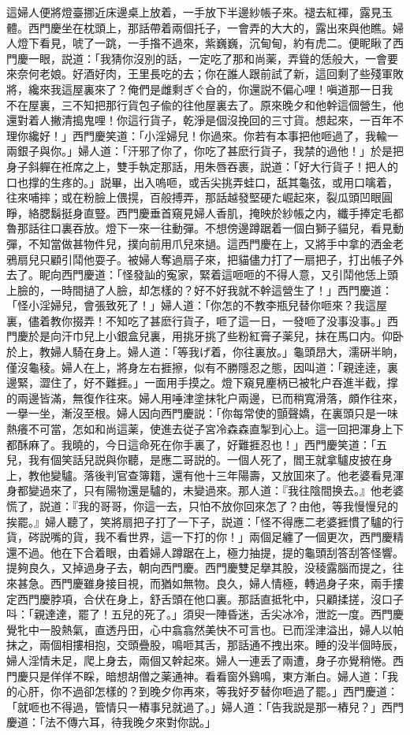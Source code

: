 這婦人便將燈臺挪近床邊桌上放着，一手放下半邊紗帳子來。褪去紅褌，露見玉體。西門慶坐在枕頭上，那話帶着兩個托子，一會弄的大大的，露出來與他瞧。婦人燈下看見，唬了一跳，一手揝不過來，紫巍巍，沉甸甸，約有虎二。便眤瞅了西門慶一眼，説道：「我猜你沒別的話，一定吃了那和尚薬，弄聳的恁般大，一會要來奈何老娘。好酒好肉，王里長吃的去；你在誰人跟前試了新，這回剩了些殘軍敗將，纔來我這屋裏來了？俺們是雌剩ぎぐ㒲的，你還説不偏心哩！嗔道那一日我不在屋裏，三不知把那行貨包子偸的往他屋裏去了。原來晚夕和他幹這個營生，他還對着人撇清搗鬼哩！你這行貨子，乾淨是個沒挽回的三寸貨。想起來，一百年不理你纔好！」西門慶笑道：「小淫婦兒！你過來。你若有本事把他咂過了，我輸一兩銀子與你。」婦人道：「汗邪了你了，你吃了甚麽行貨子，我禁的過他！」於是把身子斜軃在袵席之上，雙手執定那話，用朱唇吞裹，説道：「好大行貨子！把人的口也撑的生疼的。」説畢，出入嗚咂，或舌尖挑弄蛙口，舐其龜弦，或用口噙着，往來哺摔；或在粉臉上偎㨪，百般搏弄，那話越發堅硬た崛起來，裂瓜頭凹眼圓睜，絡腮鬍挺身直豎。西門慶垂首窺見婦人香肌，掩映於紗帳之内，纖手捧定毛都魯那話往口裏吞放。燈下一來一往動彈。不想傍邊蹲踞着一個白獅子貓兒，看見動彈，不知當做甚物件兒，撲向前用爪兒來撾。這西門慶在上，又將手中拿的洒金老鴉扇兒只顧引鬦他耍子。被婦人奪過扇子來，把貓儘力打了一扇把子，打出帳子外去了。眤向西門慶道：「怪發訕的寃家，緊着這咂咂的不得人意，又引鬦他恁上頭上臉的，一時間撾了人臉，却怎樣的？好不好我就不幹這營生了！」西門慶道：「怪小淫婦兒，會張致死了！」婦人道：「你怎的不教李瓶兒替你咂來？我這屋裏，儘着教你掇弄！不知吃了甚麽行貨子，咂了這一日，一發咂了没事没事。」西門慶於是向汗巾兒上小銀盒兒裏，用挑牙挑了些粉紅膏子薬兒，抹在馬口内。仰卧於上，教婦人騎在身上。婦人道：「等我げ着，你往裏放。」龜頭昂大，濡硏半晌，僅沒龜稜。婦人在上，將身左右捱擦，似有不勝隱忍之態，因叫道：「親逹逹，裏邊緊，澀住了，好不難捱。」一面用手摸之。燈下窺見麈柄已被牝户吞進半截，撑的兩邊皆滿，無復作往來。婦人用唾津塗抹牝户兩邊，已而稍寬滑落，頗作往來，一擧一坐，漸沒至根。婦人因向西門慶説：「你每常使的顫聲嬌，在裏頭只是一味熱癢不可當，怎如和尚這薬，使進去従子宮冷森森直掣到心上。這一回把渾身上下都酥麻了。我曉的，今日這命死在你手裏了，好難捱忍也！」西門慶笑道：「五兒，我有個笑話兒説與你聽，是應二哥説的。一個人死了，閻王就拿驢皮披在身上，教他變驢。落後判官查簿籍，還有他十三年陽壽，又放囬來了。他老婆看見渾身都變過來了，只有陽物還是驢的，未變過來。那人道：『我往陰間换去。』他老婆慌了，説道：『我的哥哥，你這一去，只怕不放你回來怎了？由他，等我慢慢兒的挨罷。』婦人聽了，笑將扇把子打了一下子，説道：「怪不得應二老婆捱慣了驢的行貨，硶説嘴的貨，我不看世界，這一下打的你！」兩個足纏了一個更次，西門慶精還不過。他在下合着眼，由着婦人蹲踞在上，極力抽提，提的龜頭刮答刮答怪響。提夠良久，又掉過身子去，朝向西門慶。西門慶雙足擧其股，没稜露腦而提之，往來甚急。西門慶雖身接目視，而猶如無物。良久，婦人情極，轉過身子來，兩手摟定西門慶脖項，合伏在身上，舒舌頭在他口裏。那話直抵牝中，只顧揉搓，沒口子呌：「親達達，罷了！五兒的死了。」須臾一陣昏迷，舌尖冰冷，泄訖一度。西門慶覺牝中一股熱氣，直透丹田，心中翕翕然美快不可言也。已而淫津溢出，婦人以帕抹之，兩個相摟相抱，交頭疊股，鳴咂其舌，那話通不拽出來。睡的没半個時辰，婦人淫情未足，爬上身去，兩個又幹起來。婦人一連丢了兩遭，身子亦覺稍惓。西門慶只是佯佯不睬，暗想胡僧之薬通神。看看窗外鷄鳴，東方漸白。婦人道：「我的心肝，你不過卻怎樣的？到晚夕你再來，等我好歹替你咂過了罷。」西門慶道：「就咂也不得過，管情只一樁事兒就過了。」婦人道：「告我説是那一樁兒？」西門慶道：「法不傳六耳，待我晚夕來對你説。」

